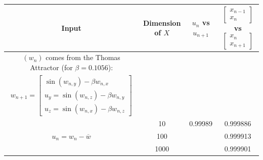 \documentclass[a4paper,12pt,twoside]{report}
\begin{document}


\begin{center}
  \begin{table} 
      \scalebox{0.75}
      {\begin{tabular}{|c|c| c c |} 
          \hline
          Input & Dimension of $X$ & $u_n$ vs $u_{n+1}$ 
          & $\begin{bmatrix}
              x_{n-1}\\
              x_n
          \end{bmatrix}$ vs $\begin{bmatrix}
              x_n\\
              x_{n+1}
          \end{bmatrix}$ \\
          \hline
          
              
          
          \hline
          $(w_n)$ comes from the Thomas Attractor (for $\beta=0.1056$): & & & \\
          {$w_{n+1}= \begin{bmatrix} \sin(w_{n,y}) - \beta{w_{n,x}} \\
              u_y = \sin(w_{n,z}) - \beta{w_{n,y}} \\
          u_z = \sin(w_{n,x}) - \beta{w_{n,z}} \end{bmatrix}$} & & & \\
          \multirow{3}{*}{$u_n = w_n - \overline{w}$}
              & 10 & 0.99989 & 0.999886 \\
              & 100 & &  0.999913 \\
              & 1000 & & 0.999901 \\
          \hline
          

\end{tabular}}
\end{table}
\end{center}
\end{document}
